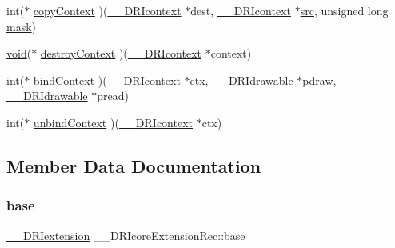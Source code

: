 \begin{DoxyCompactItemize}
\item 
int($\ast$ \hyperlink{struct_____d_r_icore_extension_rec_a99fd52f404cda5918af5fba5b9553f5e}{copy\+Context} )(\hyperlink{dri__interface_8h_a3fd295cba82b5a3d79f1ee7e12bfb908}{\+\_\+\+\_\+\+D\+R\+Icontext} $\ast$dest, \hyperlink{dri__interface_8h_a3fd295cba82b5a3d79f1ee7e12bfb908}{\+\_\+\+\_\+\+D\+R\+Icontext} $\ast$\hyperlink{glcorearb_8h_a72e0fdf0f845ded60b1fada9e9195cd7}{src}, unsigned long \hyperlink{glcorearb_8h_a2e8825c19147a8250013df8e4275f5b6}{mask})
\item 
\hyperlink{_s_d_l__opengles2__gl2ext_8h_ae5d8fa23ad07c48bb609509eae494c95}{void}($\ast$ \hyperlink{struct_____d_r_icore_extension_rec_aebb9ddac0852b22a75568195c64e3e54}{destroy\+Context} )(\hyperlink{dri__interface_8h_a3fd295cba82b5a3d79f1ee7e12bfb908}{\+\_\+\+\_\+\+D\+R\+Icontext} $\ast$context)
\item 
int($\ast$ \hyperlink{struct_____d_r_icore_extension_rec_ab2b49ae5760b170090d3f88d269857f4}{bind\+Context} )(\hyperlink{dri__interface_8h_a3fd295cba82b5a3d79f1ee7e12bfb908}{\+\_\+\+\_\+\+D\+R\+Icontext} $\ast$ctx, \hyperlink{dri__interface_8h_a5bfb832a0a08208d95b3bbef439d2262}{\+\_\+\+\_\+\+D\+R\+Idrawable} $\ast$pdraw, \hyperlink{dri__interface_8h_a5bfb832a0a08208d95b3bbef439d2262}{\+\_\+\+\_\+\+D\+R\+Idrawable} $\ast$pread)
\item 
int($\ast$ \hyperlink{struct_____d_r_icore_extension_rec_a04850b3ee32c27c78b8efac1aeeb98b6}{unbind\+Context} )(\hyperlink{dri__interface_8h_a3fd295cba82b5a3d79f1ee7e12bfb908}{\+\_\+\+\_\+\+D\+R\+Icontext} $\ast$ctx)
\end{DoxyCompactItemize}


\subsection{Member Data Documentation}
\mbox{\label{struct_____d_r_icore_extension_rec_a5f960f7c4747dbda8574a66c246f2cc0}} 
\subsubsection{\texorpdfstring{base}{base}}
{\footnotesize\ttfamily \hyperlink{dri__interface_8h_a4e0a61c8ece00d2b2c6792a9a1b55385}{\+\_\+\+\_\+\+D\+R\+Iextension} \+\_\+\+\_\+\+D\+R\+Icore\+Extension\+Rec\+::base}


